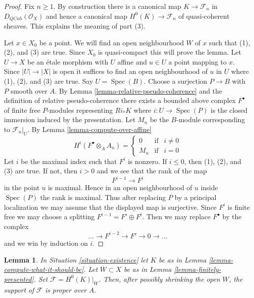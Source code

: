 \documentclass{stacks-project}
\theoremstyle{plain}
\newtheorem{lemma}[subsection]{Lemma}
\theoremstyle{definition}
\theoremstyle{remark}
\numberwithin{equation}{subsection}
\def\Spec{\mathop{\mathrm{Spec}}}
\def\QCoh{\mathit{QCoh}}
\begin{document}
\begin{proof}
Fix $n \geq 1$. By construction there is a canonical map
$K \to \mathcal{F}_n$ in $D_\QCoh(\mathcal{O}_X)$
and hence a canonical map $H^0(K) \to \mathcal{F}_n$
of quasi-coherent sheaves. This explains the meaning of part (3).

\medskip\noindent
Let $x \in X_0$ be a point. We will find an open neighbourhood $W$
of $x$ such that (1), (2), and (3) are true. Since $X_0$ is quasi-compact
this will prove the lemma. Let $U \to X$ be an \'etale morphism
with $U$ affine and $u \in U$ a point mapping to $x$. Since $|U| \to |X|$
is open it suffices to find an open neighbourhood of $u$ in $U$
where (1), (2), and (3) are true. Say $U = \Spec(B)$.
Choose a surjection $P \to B$ with $P$ smooth over $A$.
By Lemma \ref{lemma-relative-pseudo-coherence}
and the definition of relative pseudo-coherence
there exists a bounded above complex $F^\bullet$
of finite free $P$-modules representing
$Ri_*K$ where $i : U \to \Spec(P)$ is the closed
immersion induced by the presentation.
Let $M_n$ be the $B$-module corresponding to $\mathcal{F}_n|_U$.
By Lemma \ref{lemma-compute-over-affine}
$$
H^i(F^\bullet \otimes_A A_n) =
\left\{
\begin{matrix}
0 & \text{if} & i \not = 0 \\
M_n & \text{if} & i = 0
\end{matrix}
\right.
$$
Let $i$ be the maximal index such that $F^i$ is nonzero.
If $i \leq 0$, then (1), (2), and (3) are true.
If not, then $i > 0$ and we see that the rank of the map
$$
F^{i - 1} \to F^i
$$
in the point $u$ is maximal. Hence in an open neighbourhood
of $u$ inside $\Spec(P)$ the rank is maximal. Thus after replacing
$P$ by a principal localization we may assume that the displayed
map is surjective. Since $F^i$ is finite free we may choose
a splitting $F^{i - 1} = F' \oplus F^i$. Then we may
replace $F^\bullet$ by the complex
$$
\ldots \to F^{i - 2} \to F' \to 0 \to \ldots
$$
and we win by induction on $i$.
\end{proof}

\begin{lemma}
\label{lemma-proper-support}
In Situation \ref{situation-existence} let $K$ be as in
Lemma \ref{lemma-compute-what-it-should-be}. Let $W \subset X$
be as in Lemma \ref{lemma-finitely-presented}.
Set $\mathcal{F} = H^0(K)|_W$. Then, after possibly shrinking the open $W$,
the support of $\mathcal{F}$ is proper over $A$.
\end{lemma}
\end{document}

